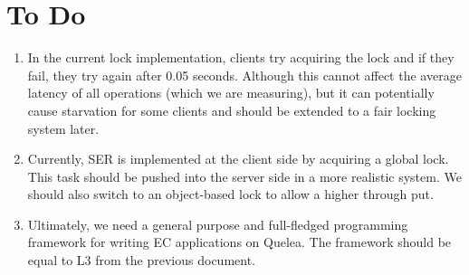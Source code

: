 \documentclass[12pt,letter]{article}
\begin{document}
\section{To Do}
\begin{enumerate}
\item In the current lock implementation, clients try acquiring the lock and if they fail, they try again after 0.05 seconds. 
	Although this cannot affect the average latency of all
	operations (which we are measuring), but it can potentially cause starvation for some clients and should be extended to a fair locking system later. 
\item Currently, SER is implemented at the client side by acquiring a
	global lock. 
This task should be pushed into the server side in a more realistic system. 
We should also switch to an object-based lock to allow a higher through put.
\item Ultimately, we need a general purpose and full-fledged programming framework for writing EC applications on Quelea. 
The framework should be equal to L3 from the previous document.
\end{enumerate}










\end{document}
